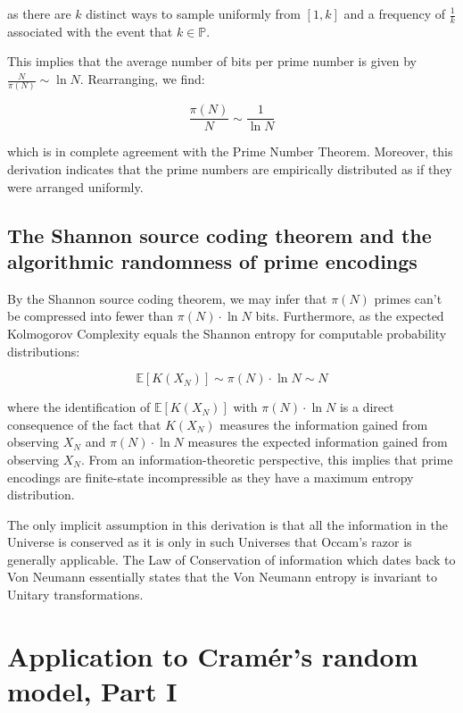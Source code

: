 \documentclass{article}
\begin{document}
as there are $k$ distinct ways to sample uniformly from $[1,k]$ and a frequency of $\frac{1}{k}$ associated with the event that $k \in \mathbb{P}$. 

This implies that the average number of bits per prime number is given by $\frac{N}{\pi(N)} \sim \ln N$. Rearranging, we find: 

\begin{equation}
\frac{\pi(N)}{N} \sim \frac{1}{\ln N}	
\end{equation}

which is in complete agreement with the Prime Number Theorem. Moreover, this derivation indicates that the prime numbers are empirically distributed as if they were arranged uniformly.  

\subsection{The Shannon source coding theorem and the algorithmic randomness of prime encodings}

By the Shannon source coding theorem, we may infer that $\pi(N)$ primes can't be compressed into fewer than $\pi(N) \cdot \ln N$ bits. Furthermore, as the expected Kolmogorov Complexity equals the Shannon entropy for computable probability distributions: 

\begin{equation}
\mathbb{E}[K(X_N)] \sim 	\pi(N) \cdot \ln N \sim N
\end{equation}

where the identification of $\mathbb{E}[K(X_N)]$ with $\pi(N) \cdot \ln N$ is a direct consequence of the fact that $K(X_N)$ measures the information gained from observing $X_N$ and $\pi(N) \cdot \ln N$ measures the expected information gained from observing $X_N$. From an information-theoretic perspective, this implies that prime encodings are finite-state incompressible as they have a maximum entropy distribution.

The only implicit assumption in this derivation is that all the information in the Universe is conserved as it is only in such Universes that Occam's razor is generally applicable. The Law of Conservation of information which dates back to Von Neumann essentially states that the Von Neumann entropy is invariant to Unitary transformations. 

\section{Application to Cramér's random model, Part I}
\end{document}
